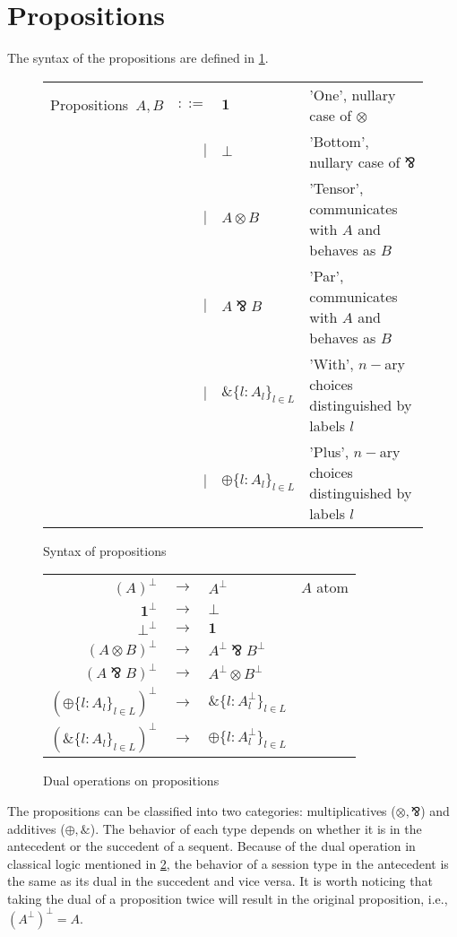 \documentclass[12pt, openany]{memoir}
\newcommand*{\pare}[0]{\mathbin{\bindnasrepma}}
\begin{document}
\section{Propositions} \label{sec:propsyntax}
The syntax of the propositions are defined in \cref{fig:propositions}.
\begin{figure}[H]
  \centering
  \begin{tabular}{c r l l}
    Propositions\ $A, B$ & $::=$ & $\textbf{1}$ & 'One', nullary case of $\otimes$ \\ 
    & $\mid$ & $\boldsymbol{\bot}$ & 'Bottom', nullary case of $\pare$  \\
    & $\mid$ & $A \otimes B$ & 'Tensor', communicates with $A$ and behaves as $B$  \\  
    & $\mid$ & $A \pare B$ & 'Par', communicates with $A$ and behaves as $B$ \\    
    & $\mid$ & $\& \{l : A_l\}_{l \in L}$ & 'With', $n-$ary choices distinguished by labels $l$ \\
    & $\mid$ & $\oplus \{l : A_l\}_{l \in L}$ & 'Plus', $n-$ary choices distinguished by labels $l$ 
   \end{tabular}
  \caption{Syntax of propositions}
  \label{fig:propositions}
\end{figure}
\begin{figure}[H]
  \centering
  \begin{tabular}{r c l l}
    $(A)^\bot$ & $\longrightarrow$ & $A^\bot$ & $A$ atom \\ 
    $\textbf{1}^\bot$ & $\longrightarrow$ & $\boldsymbol{\bot}$ & \\
    $\boldsymbol{\bot} ^ \bot$ & $\longrightarrow$ & $\textbf{1}$ & \\
    $(A \otimes B)^\bot$ & $\longrightarrow$ & $A^\bot\pare B^\bot$ &  \\  
    $(A \pare B)^\bot$ & $\longrightarrow$ & $A^\bot \otimes B^\bot$ & \\    
    $(\oplus\{l : A_l\}_{l \in L})^\bot$ & $\longrightarrow$ & $\& \{l : A_l^\bot\}_{l \in L}$ & \\ 
    $(\&\{l : A_l\}_{l \in L})^\bot$ & $\longrightarrow$ & $\oplus \{l : A_l^\bot\}_{l \in L}$ & \\
   \end{tabular}
  \caption{Dual operations on propositions}
  \label{fig:dual}
\end{figure}
The propositions can be classified into two categories: multiplicatives ($\otimes, \pare$) and additives ($\oplus, \&$). 
The behavior of each type depends on whether it is in the antecedent or the succedent of a sequent. 
Because of the dual operation in classical logic mentioned in \cref{fig:dual}, 
the behavior of a session type in the antecedent is the same as its dual in the succedent and vice versa. 
It is worth noticing that taking the dual of a proposition twice will result in the original proposition, i.e., ${(A^\bot)}^\bot = A$.
\end{document}
